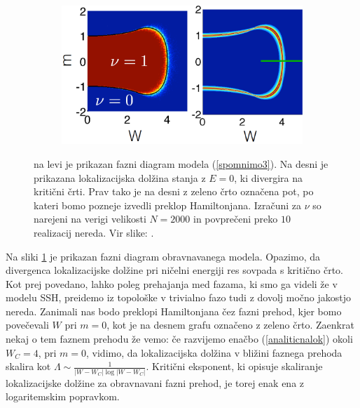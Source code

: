 \begin{figure}[!h]
\centering
\begin{subfigure}{.7\textwidth}
\includegraphics[width=\linewidth]{Figures/CriticalSurface.png}
\end{subfigure}
\caption{na levi je prikazan fazni diagram modela (\ref{spomnimo3}). Na desni je prikazana lokalizacijska dolžina stanja z $E=0$, ki divergira na kritični črti. Prav tako je na desni z zeleno črto označena pot, po kateri bomo pozneje izvedli preklop Hamiltonjana. Izračuni za $\nu$ so narejeni na verigi velikosti $N=2000$ in povprečeni preko $10$ realizacij nereda. Vir slike: \cite{mondragon}.}
\label{fig:CriticalSurface}
\end{figure}

Na sliki \ref{fig:CriticalSurface} je prikazan fazni diagram obravnavanega modela. Opazimo, da divergenca lokalizacijske dolžine pri ničelni energiji res sovpada s kritično črto. Kot prej povedano, lahko poleg prehajanja med fazama, ki smo ga videli že v modelu SSH, preidemo iz topološke v trivialno fazo tudi z dovolj močno jakostjo nereda. Zanimali nas bodo preklopi Hamiltonjana čez fazni prehod, kjer bomo povečevali $W$ pri $m=0$, kot je na desnem grafu označeno z zeleno črto.
Zaenkrat nekaj o tem faznem prehodu že vemo: če razvijemo enačbo (\ref{analiticnalok}) okoli $W_C=4$, pri $m=0$, vidimo, da lokalizacijska dolžina v bližini faznega prehoda skalira kot $\Lambda \sim \frac{1}{|W-W_C| \log |W-W_C|}$. Kritični eksponent, ki opisuje skaliranje lokalizacijske dolžine za obravnavani fazni prehod, je torej enak ena z logaritemskim popravkom.

